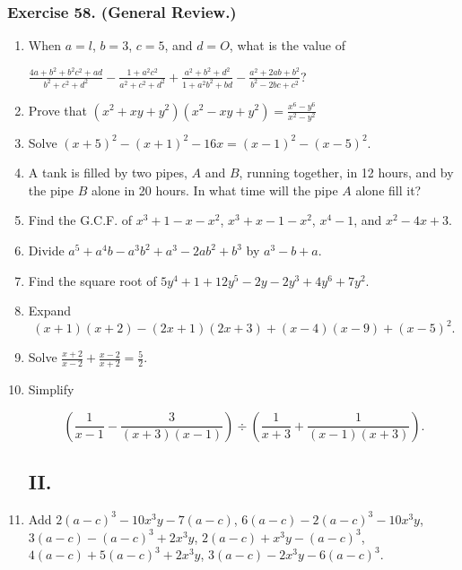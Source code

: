\documentclass{book}
\begin{document}
\subsubsection*{Exercise 58. (General Review.)}
\begin{enumerate}
\item When $a=l$, $b = 3$, $c = 5$, and $d = O$, what is the
value of

$\displaystyle
\frac{4a+b^2+b^2c^2+ad}{b^2+c^2+d^2}-\frac{1+a^2c^2}{a^2+c^2+d^2}
+\frac{a^2+b^2+d^2}{1+a^2b^2+bd}-\frac{a^2+2ab+b^2}{b^2-2bc+c^2}$?

\item Prove that $\displaystyle
(x^{2}+xy+y^{2})(x^{2}-xy+y^2)=\frac{x^{6}-y^{6}}{x^{2}-y^{2}}$

\item Solve $(x+5)^{2}-(x+1)^{2}-16x=(x-1)^{2}-(x-5)^{2}$.

\item A tank is filled by two pipes, $A$ and $B$, running
together, in 12 hours, and by the pipe $B$ alone in 20 hours.
In what time will the pipe $A$ alone fill it?

\item Find the G.C.F. of  $x^{3}+1-x-x^{2}$, $x^{3}+x-1-x^{2}$,
$x^{4}-1$, and $x^{2}-4x+3$.

\item Divide $a^{5}+a^{4}b-a^{3}b^{2}+a^{3}-2ab^{2}+b^{3}$ by $a^{3}-b+a$.

\item Find the square root of $5y^{4}+1+12y^{5}-2y-2y^{3}+4y^{6}+7y^{2}$.

\item Expand
\[
(x+1)(x+2)-(2x+1)(2x+3)+(x-4)(x-9)+(x-5)^{2}.
\]

\item Solve $\displaystyle
\frac{x+2}{x-2}+\frac{x-2}{x+2}=\frac{5}{2}$.

\item Simplify

\[
\left(\frac{1}{x-1}-\frac{3}{(x+3)(x-1)}\right)\div\left(\frac{1}{x+3}+\frac{1}{(x-1)(x+3)}\right).
\]

\subsection*{II.}

\item Add $2(a-c)^{3}-10x^{3}y-7(a-c)$, $6(a-c)-2(a-c)^{3}-10x^{3}y$,
$3(a-c)-(a-c)^{3}+2x^{3}y$, $2(a-c)+x^{3}y-(a-c)^{3}$,
$4(a-c)+5(a-c)^3+2x^{3}y$, $3(a-c)-2x^{3}y-6(a-c)^3$.


\end{enumerate}
\end{document}
